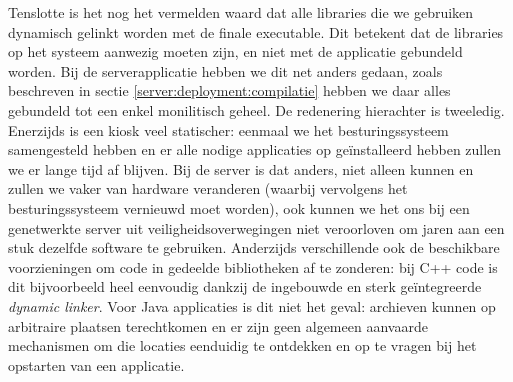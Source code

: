 Tenslotte is het nog het vermelden waard dat alle libraries die we gebruiken dynamisch gelinkt worden met de finale executable. Dit betekent dat de libraries op het systeem aanwezig moeten zijn, en niet met de applicatie gebundeld worden. Bij de serverapplicatie hebben we dit net anders gedaan, zoals beschreven in sectie \ref{server:deployment:compilatie} hebben we daar alles gebundeld tot een enkel monilitisch geheel. De redenering hierachter is tweeledig. Enerzijds is een kiosk veel statischer: eenmaal we het besturingssysteem samengesteld hebben en er alle nodige applicaties op geïnstalleerd hebben zullen we er lange tijd af blijven. Bij de server is dat anders, niet alleen kunnen en zullen we vaker van hardware veranderen (waarbij vervolgens het besturingssysteem vernieuwd moet worden), ook kunnen we het ons bij een genetwerkte server uit veiligheidsoverwegingen niet veroorloven om jaren aan een stuk dezelfde software te gebruiken. Anderzijds verschillende ook de beschikbare voorzieningen om code in gedeelde bibliotheken af te zonderen: bij C++ code is dit bijvoorbeeld heel eenvoudig dankzij de ingebouwde en sterk geïntegreerde \emph{dynamic linker}. Voor Java applicaties is dit niet het geval: archieven kunnen op arbitraire plaatsen terechtkomen en er zijn geen algemeen aanvaarde mechanismen om die locaties eenduidig te ontdekken en op te vragen bij het opstarten van een applicatie.

